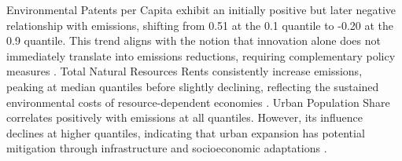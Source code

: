 \documentclass[10pt]{article}
\begin{document}
Environmental Patents per Capita exhibit an initially positive but later negative relationship with emissions, shifting from 0.51 at the 0.1 quantile to -0.20 at the 0.9 quantile. This trend aligns with the notion that innovation alone does not immediately translate into emissions reductions, requiring complementary policy measures \citep{TOBELMANN2020118787}. Total Natural Resources Rents consistently increase emissions, peaking at median quantiles before slightly declining, reflecting the sustained environmental costs of resource-dependent economies \citep{wangImpactRiskFactors2024}. Urban Population Share correlates positively with emissions at all quantiles. However, its influence declines at higher quantiles, indicating that urban expansion has potential mitigation through infrastructure and socioeconomic adaptations \citep{land12050981}.
\end{document}
